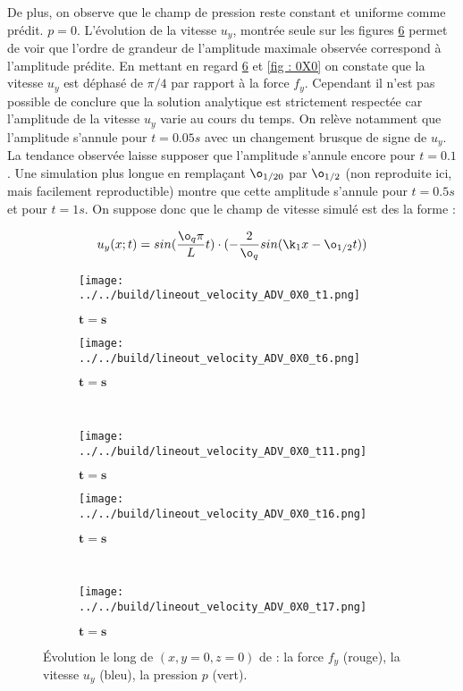 De plus, on observe que le champ de pression reste constant et uniforme comme prédit. $p = 0$. L’évolution de la vitesse $u_y$, montrée seule sur les figures \ref{fig : v_0X0} permet de voir que l'ordre de grandeur de l'amplitude maximale observée correspond à l'amplitude prédite. En mettant en regard \ref{fig : v_0X0} et \ref{fig : 0X0} on constate que la vitesse $u_y$ est déphasé de $\pi/4$ par rapport à la force $f_y$. Cependant il n'est pas possible de conclure que la solution analytique est strictement respectée car l'amplitude de la vitesse $u_y$ varie au cours du temps. On relève notamment que l'amplitude s'annule pour $t=0.05s$ avec un changement brusque de signe de $u_y$. La tendance observée laisse supposer que l'amplitude s'annule encore pour $t=0.1$. Une simulation plus longue en remplaçant $\o_{1/20}$ par $\o_{1/2}$ (non reproduite ici, mais facilement reproductible) montre que cette amplitude s'annule pour $t=0.5s$ et pour $t=1s$. On suppose donc que le champ de vitesse simulé est des la forme :

\begin{align}
u_y(x;t) = sin(\frac{\o_q \pi}{L} t ) \cdot ( - \frac{2}{\o_{q}} sin(\k_1 x - \o_{1/2} t))
\end{align}


\begin{figure}
\begin{center}
	\begin{subfigure}[t]{0.4\textwidth}                                                                                                                                   
		\texttt{[image: ../../build/lineout\_velocity\_ADV\_0X0\_t1.png]}
		\caption{ $\bm{t=s}$}
		\label{fig : v_0X0_t1}
	\end{subfigure}\hfill
	\begin{subfigure}[t]{0.4\textwidth}
		\texttt{[image: ../../build/lineout\_velocity\_ADV\_0X0\_t6.png]}
		\caption{ $\bm{t=s}$}
		\label{fig : v_0X0_t6}
	\end{subfigure}
\\
	\begin{subfigure}[t]{0.4\textwidth}
		\texttt{[image: ../../build/lineout\_velocity\_ADV\_0X0\_t11.png]}
		\caption{ $\bm{t=s}$}
		\label{fig : v_0X0_t11}
	\end{subfigure}\hfill
	\begin{subfigure}[t]{0.4\textwidth}
		\texttt{[image: ../../build/lineout\_velocity\_ADV\_0X0\_t16.png]}
		\caption{ $\bm{t=s}$}
		\label{fig : v_0X0_t16}
	\end{subfigure}
\\
	\begin{subfigure}[t]{0.4\textwidth}
		\texttt{[image: ../../build/lineout\_velocity\_ADV\_0X0\_t17.png]}
		\caption{ $\bm{t=s}$}
		\label{fig : v_0X0_t17}
	\end{subfigure}	
\end{center}
\caption{Évolution le long de $(x,y=0,z=0)$ de : la force $f_y$ (rouge), la vitesse $u_y$ (bleu), la pression $p$ (vert).}
\label{fig : v_0X0}
\end{figure}



